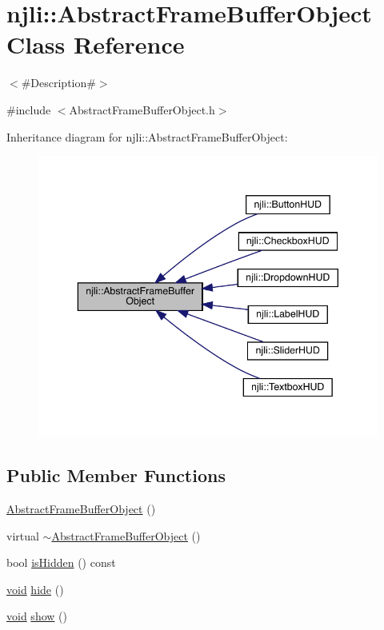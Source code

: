 \hypertarget{classnjli_1_1_abstract_frame_buffer_object}{}\section{njli\+:\+:Abstract\+Frame\+Buffer\+Object Class Reference}
\label{classnjli_1_1_abstract_frame_buffer_object}


$<$\#\+Description\#$>$  




{\ttfamily \#include $<$Abstract\+Frame\+Buffer\+Object.\+h$>$}



Inheritance diagram for njli\+:\+:Abstract\+Frame\+Buffer\+Object\+:\nopagebreak
\begin{figure}[H]
\begin{center}
\leavevmode
\includegraphics[width=343pt]{classnjli_1_1_abstract_frame_buffer_object__inherit__graph}
\end{center}
\end{figure}
\subsection*{Public Member Functions}
\begin{DoxyCompactItemize}
\item 
\mbox{\hyperlink{classnjli_1_1_abstract_frame_buffer_object_ac8d66ca8d605b2c45873fc4020c579ee}{Abstract\+Frame\+Buffer\+Object}} ()
\item 
virtual \mbox{\hyperlink{classnjli_1_1_abstract_frame_buffer_object_a7899eafef8e2f57953a5d1aa799085eb}{$\sim$\+Abstract\+Frame\+Buffer\+Object}} ()
\item 
bool \mbox{\hyperlink{classnjli_1_1_abstract_frame_buffer_object_a3009efb11b4bcd56bd933c21b230a125}{is\+Hidden}} () const
\item 
\mbox{\hyperlink{_thread_8h_af1e856da2e658414cb2456cb6f7ebc66}{void}} \mbox{\hyperlink{classnjli_1_1_abstract_frame_buffer_object_a5d7b8b3bc421084f282343e506a6d289}{hide}} ()
\item 
\mbox{\hyperlink{_thread_8h_af1e856da2e658414cb2456cb6f7ebc66}{void}} \mbox{\hyperlink{classnjli_1_1_abstract_frame_buffer_object_a73ffd499fceaacd59b518a541ed2133e}{show}} ()
\end{DoxyCompactItemize}
